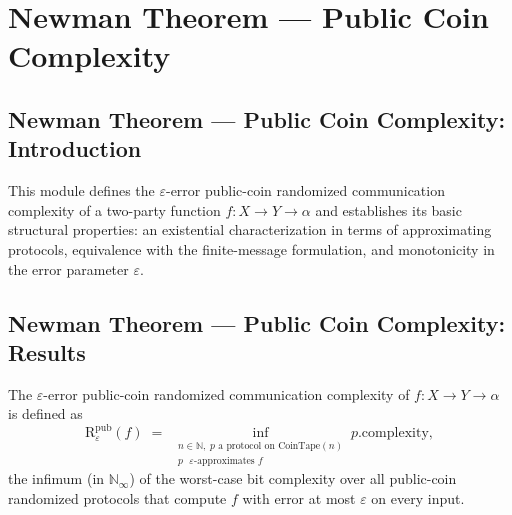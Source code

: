\section{Newman Theorem --- Public Coin Complexity}
\subsection*{Newman Theorem --- Public Coin Complexity: Introduction}

This module defines the $\varepsilon$-error public-coin randomized communication
complexity of a two-party function $f : X \to Y \to \alpha$ and establishes its basic
structural properties: an existential characterization in terms of approximating
protocols, equivalence with the finite-message formulation, and monotonicity in the
error parameter $\varepsilon$.

\subsection*{Newman Theorem --- Public Coin Complexity: Results}

\begin{definition}
\label{CommunicationComplexity.PublicCoin.communicationComplexity}
\leanok
{}
The $\varepsilon$-error public-coin randomized communication complexity of
$f : X \to Y \to \alpha$ is defined as
\[
  \mathrm{R}^{\mathrm{pub}}_\varepsilon(f)
  \;=\;
  \inf_{\substack{n \in \mathbb{N},\; p \text{ a protocol on } \mathrm{CoinTape}(n) \\ p \text{ $\varepsilon$-approximates } f}}
  p.\mathrm{complexity},
\]
the infimum (in $\mathbb{N}_\infty$) of the worst-case bit complexity over all
public-coin randomized protocols that compute $f$ with error at most $\varepsilon$ on
every input.
\end{definition}

